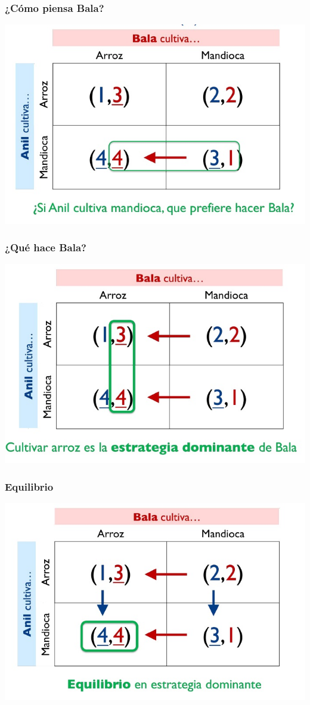 \documentclass{beamer}
\begin{document}
\begin{frame}
\frametitle{ ¿Cómo piensa Bala?}
\centering
\includegraphics[scale=0.6]{Slides Principios de Economia/Figures/Tema_03_17_bala.jpg}
\end{frame}

\begin{frame}
\frametitle{ ¿Qué hace Bala?}
\centering
\includegraphics[scale=0.6]{Slides Principios de Economia/Figures/Tema_03_18_bala.jpg}
\end{frame}

\begin{frame}
\frametitle{Equilibrio}
\centering
\includegraphics[scale=0.6]{Slides Principios de Economia/Figures/Tema_03_19_bala.jpg}
\end{frame}
\end{document}
